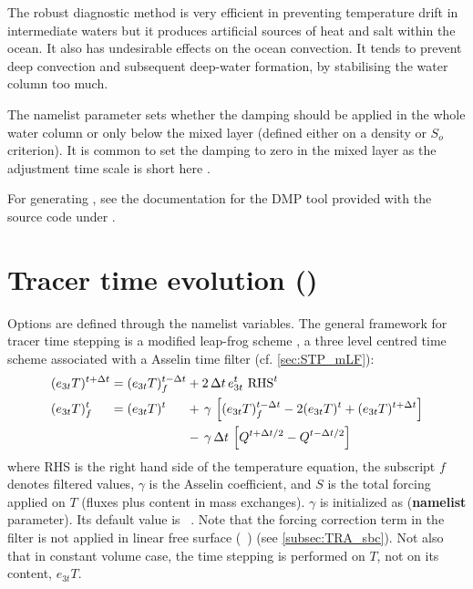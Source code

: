 \documentclass[../main/NEMO_manual]{subfiles}
\begin{document}
The robust diagnostic method is very efficient in preventing temperature drift in intermediate waters but
it produces artificial sources of heat and salt within the ocean.
It also has undesirable effects on the ocean convection.
It tends to prevent deep convection and subsequent deep-water formation, by stabilising the water column too much.

The namelist parameter  sets whether the damping should be applied in the whole water column or
only below the mixed layer (defined either on a density or $S_o$ criterion).
It is common to set the damping to zero in the mixed layer as the adjustment time scale is short here
\citep{Madec_al_JPO96}.

For generating , see the documentation for the DMP tool provided with the source code under
.

\section{Tracer time evolution (\protect{})}
\label{sec:TRA_nxt}


Options are defined through the  namelist variables.
The general framework for tracer time stepping is a modified leap-frog scheme \citep{Leclair_Madec_OM09},
\ie a three level centred time scheme associated with a Asselin time filter (cf. \autoref{sec:STP_mLF}):
\begin{equation}
  \label{eq:tra_nxt}
  \begin{alignedat}{3}
    &(e_{3t}T)^{t + \Delta t} &&= (e_{3t}T)_f^{t - \Delta t} &&+ 2 \, \Delta t \,e_{3t}^t \ \text{RHS}^t \\
    &(e_{3t}T)_f^t        &&= (e_{3t}T)^t            &&+ \, \gamma \, \left[ (e_{3t}T)_f^{t - \Delta t} - 2(e_{3t}T)^t + (e_{3t}T)^{t + \Delta t} \right] \\
    &                     &&                         &&- \, \gamma \, \Delta t \, \left[ Q^{t + \Delta t/2} - Q^{t - \Delta t/2} \right]  
  \end{alignedat}
\end{equation} 
where RHS is the right hand side of the temperature equation, the subscript $f$ denotes filtered values,
$\gamma$ is the Asselin coefficient, and $S$ is the total forcing applied on $T$
(\ie fluxes plus content in mass exchanges).
$\gamma$ is initialized as  (\textbf{namelist} parameter).
Its default value is ~.
Note that the forcing correction term in the filter is not applied in linear free surface
(~) (see \autoref{subsec:TRA_sbc}).
Not also that in constant volume case, the time stepping is performed on $T$, not on its content, $e_{3t}T$.
\end{document}
